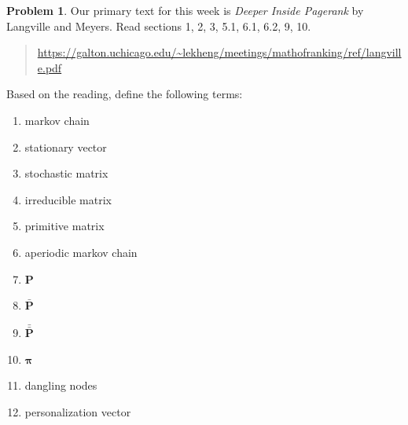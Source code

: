 \documentclass[10pt]{article}
\theoremstyle{definition}
\newtheorem{problem}{Problem}
\newcommand{\p}{\mathbf P}
\newcommand{\pb}{\bar {\p}}
\newcommand{\pbb}{\bar {\pb}}
\newcommand{\pr}{\bm \pi}
\begin{document}
\begin{problem}
    Our primary text for this week is \emph{Deeper Inside Pagerank} by Langville and Meyers.
    Read sections 1, 2, 3, 5.1, 6.1, 6.2, 9, 10.
    \begin{quote}
    \url{https://galton.uchicago.edu/~lekheng/meetings/mathofranking/ref/langville.pdf}
    \end{quote}
    Based on the reading, define the following terms:
    \begin{enumerate}
        \item markov chain
            \vspace{3in}
        \item stationary vector
            \vspace{2in}
        \item stochastic matrix
            \vspace{2in}
        \item irreducible matrix
            \vspace{2in}
        \item primitive matrix
            \vspace{2in}
        \item aperiodic markov chain
            \vspace{2in}
        \item $\p$
            \vspace{2in}
        \item $\pb$
            \vspace{2in}
        \item $\pbb$
            \vspace{2in}
        \item $\pr$
            \vspace{2in}
        \item dangling nodes
            \vspace{2in}
        \item personalization vector
            \vspace{2in}
    \end{enumerate}
\end{problem}


%
\end{document}
